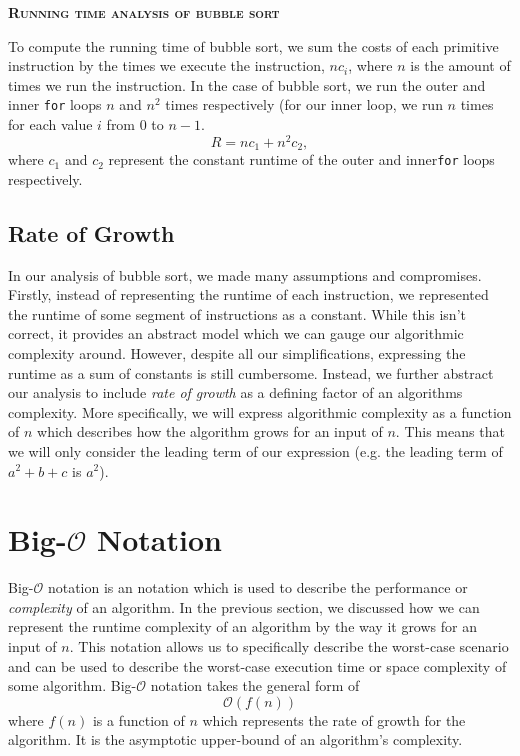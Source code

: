 \documentclass{cslesson}
\numberwithin{equation}{section}
\begin{document}
\begin{algorithm}[h]
\caption*{\textsc{\textbf{Running time analysis of bubble sort}}}
\begin{algorithmic} 
\ENDIF
\ENDFOR
\ENDFOR
\end{algorithmic}
\end{algorithm}

To compute the running time of bubble sort, we sum the costs of each primitive instruction by the times we execute the instruction, $nc_i$, where $n$ is the amount of times we run the instruction. In the case of bubble sort, we run the outer and inner \texttt{for} loops $n$ and $n^2$ times respectively (for our inner loop, we run $n$ times for each value $i$ from $0$ to $n-1$.
\begin{equation*}
    R=nc_1 + n^2c_2,
\end{equation*}
where $c_1$ and $c_2$ represent the constant runtime of the outer and inner\texttt{for} loops respectively.

\subsection{Rate of Growth}
In our analysis of bubble sort, we made many assumptions and compromises. Firstly, instead of representing the runtime of each instruction, we represented the runtime of some segment of instructions as a constant. While this isn't correct, it provides an abstract model which we can gauge our algorithmic complexity around. However, despite all our simplifications, expressing the runtime as a sum of constants is still cumbersome. Instead, we further abstract our analysis to include \textit{rate of growth} as a defining factor of an algorithms complexity. More specifically, we will express algorithmic complexity as a function of $n$ which describes how the algorithm grows for an input of $n$. This means that we will only consider the leading term of our expression (e.g. the leading term of $a^2 + b + c$ is $a^2$).

\section{Big-$\mathcal{O}$ Notation}
Big-$\mathcal{O}$ notation is an notation which is used to describe the performance or \textit{complexity} of an algorithm. In the previous section, we discussed how we can represent the runtime complexity of an algorithm by the way it grows for an input of $n$. This notation allows us to specifically describe the worst-case scenario and can be used to describe the worst-case execution time or space complexity of some algorithm. Big-$\mathcal{O}$ notation takes the general form of \begin{equation*}
    \mathcal{O}(f(n))
\end{equation*} where $f(n)$ is a function of $n$ which represents the rate of growth for the algorithm. It is the asymptotic upper-bound of an algorithm's complexity.
\end{document}
